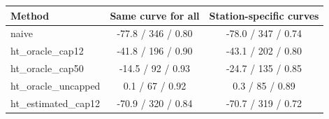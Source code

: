 \begin{tabular}{lcc}
\toprule
Method & Same curve for all & Station-specific curves \\
\midrule
naive & -77.8 / 346 / 0.80 & -78.0 / 347 / 0.74 \\
ht\_oracle\_cap12 & -41.8 / 196 / 0.90 & -43.1 / 202 / 0.80 \\
ht\_oracle\_cap50 & -14.5 / 92 / 0.93 & -24.7 / 135 / 0.85 \\
ht\_oracle\_uncapped & 0.1 / 67 / 0.92 & 0.3 / 85 / 0.89 \\
ht\_estimated\_cap12 & -70.9 / 320 / 0.84 & -70.7 / 319 / 0.72 \\
\bottomrule
\end{tabular}
